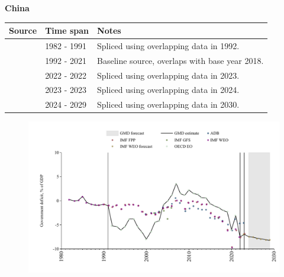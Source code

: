 \documentclass[12pt,a4paper,landscape]{article}
\begin{document}
\begin{adjustbox}{max totalsize={\paperwidth}{\paperheight},center}
\begin{minipage}[t][\textheight][t]{\textwidth}
\vspace*{0.5cm}
{}
\begin{center}
{\Large\bfseries China}
\end{center}
\vspace{0.5cm}
\begin{table}[H]
\centering
\small
\begin{tabular}{|l|l|l|}
\hline
\textbf{Source} & \textbf{Time span} & \textbf{Notes} \\
\hline
\rowcolor{white}\cite{IMF_WEO}& 1982 - 1991 &Spliced using overlapping data in 1992.\\
\rowcolor{lightgray}\cite{OECD_EO}& 1992 - 2021 &Baseline source, overlaps with base year 2018.\\
\rowcolor{white}\cite{IMF_WEO}& 2022 - 2022 &Spliced using overlapping data in 2023.\\
\rowcolor{lightgray}\cite{IMF_FPP}& 2023 - 2023 &Spliced using overlapping data in 2024.\\
\rowcolor{white}\cite{IMF_WEO_forecast}& 2024 - 2029 &Spliced using overlapping data in 2030.\\
\hline
\end{tabular}
\end{table}
\begin{figure}[H]
\centering
\includegraphics[width=\textwidth,height=0.6\textheight,keepaspectratio]{graphs/CHN_govdef_GDP.pdf}
\end{figure}
\end{minipage}
\end{adjustbox}
\end{document}

